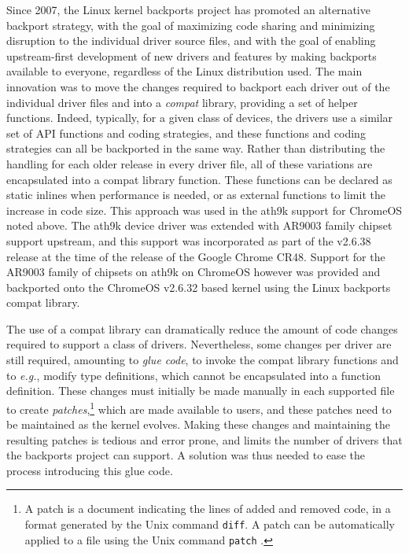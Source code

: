 Since 2007, the Linux kernel backports project has promoted an alternative
backport strategy, with the goal of maximizing code sharing and minimizing
disruption to the individual driver source files, and with the goal of
enabling upstream-first development of new drivers and features by making
backports available to everyone, regardless of the Linux distribution used.
The main innovation was to move the changes required to backport each
driver out of the individual driver files and into a {\em compat} library,
providing a set of helper functions.  Indeed, typically, for a given class
of devices, the drivers use a similar set of API functions and coding
strategies, and these functions and coding strategies can all be backported
in the same way.  Rather than distributing the handling for each older
release in every driver file, all of these variations are encapsulated into
a compat library function.  These functions can be declared as static
inlines when performance is needed, or as external functions to limit the
increase in code size.  This approach was used in the ath9k support for
ChromeOS noted above. The ath9k device driver was extended with AR9003
family chipset support upstream, and this support was incorporated as part
of the v2.6.38 release at the time of the release of the Google Chrome
CR48. Support for the AR9003 family of chipsets on ath9k on ChromeOS
however was provided and backported onto the ChromeOS v2.6.32 based kernel
using the Linux backports compat library.


The use of a compat library can dramatically reduce the amount of code
changes required to support a class of drivers.  Nevertheless, some changes
per driver are still required, amounting to {\em glue code}, to invoke the
compat library functions and to {\em e.g.}, modify type definitions, which
cannot be encapsulated into a function definition.  These changes must
initially be made manually in each supported file to create {\em
  patches},\footnote{A patch is a document indicating the lines of added
  and removed code, in a format generated by the Unix command {\tt diff}.
  A patch can be automatically applied to a file using the Unix command
  {\tt patch} \cite{diffmanual:02}.} which are made available to users, and
these patches need to be maintained as the kernel evolves.  Making these
changes and maintaining the resulting patches is tedious and error prone,
and limits the number of drivers that the backports project can support.  A
solution was thus needed to ease the process introducing this glue code.

